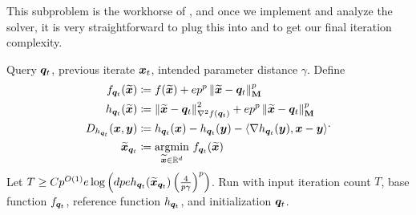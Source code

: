 This subproblem is the workhorse of , and once we implement and analyze the solver, it is very straightforward to plug this into  and  to get our final iteration complexity.

\begin{algorithm}[H]
\caption{\textsf{GpRegressionProxOracle}: Implements $\frac{1}{2}$-MS oracle for $\gnorm{\cdot}{p}$ regression (see  and .}
\label{alg:gp_prox_solver}
\begin{algorithmic}[1]
\Require Query $\bm{q}_t$, previous iterate $\bm{x}_t$, intended parameter distance $\gamma$.
\State Define \begin{equation*}
    \begin{aligned}
    f_{\bm{q}_t}(\widetilde{\bm{x}}) &\coloneqq f(\widetilde{\bm{x}}) + ep^p\left\lVert \widetilde{\bm{x}}-\bm{q}_t \right\rVert_{\mathbf{M}}^p \\
    h_{\bm{q}_t}(\widetilde{\bm{x}}) &\coloneqq \left\lVert \widetilde{\bm{x}}-\bm{q}_t \right\rVert_{\nabla^2 f(\bm{q}_t)}^2 + ep^p\left\lVert \widetilde{\bm{x}}-\bm{q}_t \right\rVert_{\mathbf{M}}^p \\
    D_{h_{\bm{q}_t}}(\bm{x},\bm{y}) &\coloneqq h_{\bm{q}_t}(\bm{x})-h_{\bm{q}_t}(\bm{y}) - \left\langle \nabla h_{\bm{q}_t}(\bm{y}),\bm{x}-\bm{y} \right\rangle \\
    \widetilde{\bm{x}}_{\bm{q}_t} &\coloneqq \underset{\widetilde{\bm{x}}\in\mathbb{R}^d}{\mathrm{argmin}}\  f_{\bm{q}_t}(\widetilde{\bm{x}})
    \end{aligned}.
\end{equation*}
\State Let $T \ge Cp^{O(1)}e\log\left(dpeh_{\bm{q}_t}(\widetilde{\bm{x}}_{\bm{q}_t})\left(\frac{4}{p\gamma}\right)^p\right)$.
\State Run  with input iteration count $T$, base function $f_{\bm{q}_t}$, reference function $h_{\bm{q}_t}$, and initialization $\bm{q}_t$.
\end{algorithmic}
\end{algorithm}


